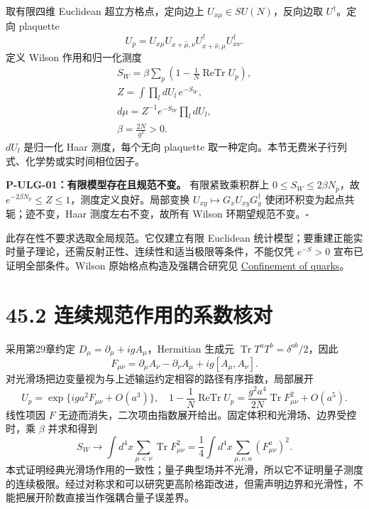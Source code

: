 \documentclass[
  11pt,
  oneside]{book}
\begin{document}
取有限四维 Euclidean 超立方格点，定向边上
\(U_{x\mu}\in SU(N)\)，反向边取 \(U^\dagger\)。定向 plaquette \[
U_p=U_{x\mu}U_{x+\hat\mu,\nu}U^\dagger_{x+\hat\nu,\mu}U^\dagger_{x\nu}.
\] 定义 Wilson 作用和归一化测度 \[
\begin{gathered}
S_W=\beta\sum_p\left(1-\frac1N\operatorname{ReTr}U_p\right),
\\ Z=\int\prod_l dU_l\,e^{-S_W},\\ d\mu=Z^{-1}e^{-S_W}\prod_l dU_l,
\\\beta=\frac{2N}{g^2}>0.
\end{gathered}
\] \(dU_l\) 是归一化 Haar 测度，每个无向 plaquette
取一种定向。本节无费米子行列式、化学势或实时间相位因子。

\protect\hypertarget{p-ulg-01}{}{}

\textbf{P-ULG-01：有限模型存在且规范不变。} 有限紧致乘积群上
\(0\le S_W\le2\beta N_p\)，故
\(e^{-2\beta N_p}\le Z\le1\)，测度定义良好。局部变换
\(U_{xy}\mapsto G_xU_{xy}G_y^\dagger\)
使闭环积变为起点共轭；迹不变，Haar 测度左右不变，故所有 Wilson
环期望规范不变。\(\square\)

此存在性不要求选取全局规范。它仅建立有限 Euclidean
统计模型；要重建正能实时量子理论，还需反射正性、连续性和适当极限等条件，不能仅凭
\(e^{-S}>0\) 宣布已证明全部条件。Wilson 原始格点构造及强耦合研究见
\href{https://link.aps.org/doi/10.1103/PhysRevD.10.2445}{Confinement of
quarks}。

\hypertarget{ux8fdeux7eedux89c4ux8303ux4f5cux7528ux7684ux7cfbux6570ux6838ux5bf9}{%
\section{45.2
连续规范作用的系数核对}\label{ux8fdeux7eedux89c4ux8303ux4f5cux7528ux7684ux7cfbux6570ux6838ux5bf9}}

采用第29章约定 \(D_\mu=\partial_\mu+igA_\mu\)，Hermitian 生成元
\(\operatorname{Tr}T^aT^b=\delta^{ab}/2\)，因此 \[
F_{\mu\nu}=\partial_\mu A_\nu-\partial_\nu A_\mu+ig[A_\mu,A_\nu].
\] 对光滑场把边变量视为与上述输运约定相容的路径有序指数，局部展开 \[
U_p=\exp\{iga^2F_{\mu\nu}+O(a^3)\},\quad
1-\frac1N\operatorname{ReTr}U_p
=\frac{g^2a^4}{2N}\operatorname{Tr}F_{\mu\nu}^2+O(a^5).
\] 线性项因 \(F\)
无迹而消失，二次项由指数展开给出。固定体积和光滑场、边界受控时，乘
\(\beta\) 并求和得到 \[
S_W\longrightarrow\int d^4x\sum_{\mu<\nu}\operatorname{Tr}F_{\mu\nu}^2
=\frac14\int d^4x\sum_{\mu,\nu,a}(F_{\mu\nu}^a)^2.
\]
本式证明经典光滑场作用的一致性；量子典型场并不光滑，所以它不证明量子测度的连续极限。经过对称求和可以研究更高阶格距改进，但需声明边界和光滑性，不能把展开阶数直接当作强耦合量子误差界。
\end{document}
